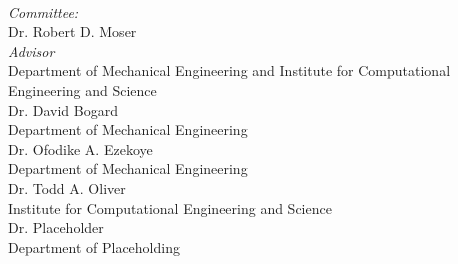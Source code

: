 \begin{titlepage}
\begin{minipage}{0.5\textwidth}
\begin{flushleft} \large
{}%
\end{flushleft}
\end{minipage}
~
\begin{minipage}{0.45\textwidth}
\begin{flushright} \large
\emph{Committee:} \\
 \vspace{5mm}
{\Large Dr. Robert D. Moser} \\
{\normalsize \textsl{Advisor}} \\
{\normalsize Department of Mechanical Engineering and Institute for Computational Engineering and Science} \\
 \vspace{5mm}
{\Large Dr. David Bogard} \\
{\normalsize Department of Mechanical Engineering} \\
 \vspace{5mm}
{\Large Dr. Ofodike A. Ezekoye} \\
{\normalsize Department of Mechanical Engineering} \\
 \vspace{5mm}
{\Large Dr. Todd A. Oliver} \\
{\normalsize Institute for Computational Engineering and Science} \\
 \vspace{5mm}
{\Large Dr. Placeholder} \\
{\normalsize Department of Placeholding} \\
\end{flushright}
\end{minipage}\\[4cm]




 

\vfill %

\end{titlepage}
%
